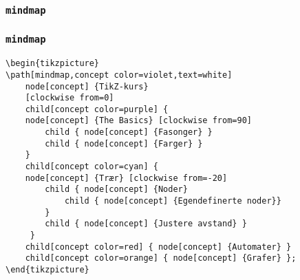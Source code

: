 \documentclass{beamer}
\begin{document}
\begin{frame}[fragile]
\frametitle{\texttt{mindmap}}

\begin{center}
\end{center}

\end{frame}

\begin{frame}[fragile]
\frametitle{\texttt{mindmap}}

\begin{Verbatim}[fontsize=\scriptsize, frame=single]
\begin{tikzpicture}
\path[mindmap,concept color=violet,text=white]
    node[concept] {TikZ-kurs}
    [clockwise from=0]
    child[concept color=purple] { 
    node[concept] {The Basics} [clockwise from=90]
        child { node[concept] {Fasonger} }
        child { node[concept] {Farger} }
    }  
    child[concept color=cyan] {
    node[concept] {Trær} [clockwise from=-20]
        child { node[concept] {Noder} 
            child { node[concept] {Egendefinerte noder}}
        }
        child { node[concept] {Justere avstand} }
     }
    child[concept color=red] { node[concept] {Automater} }
    child[concept color=orange] { node[concept] {Grafer} };
\end{tikzpicture}
\end{Verbatim}

\end{frame}
\end{document}
